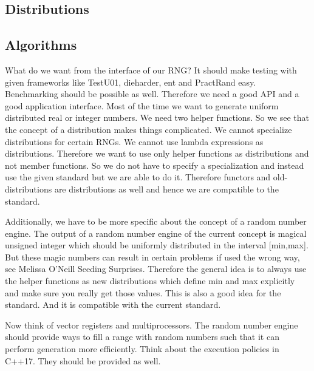 \documentclass{stdlocal}
\begin{document}
  \subsection{Distributions} %
  \label{sub:distributions}


  \subsection{Algorithms} %
  \label{sub:algorithms}


  What do we want from the interface of our RNG?
  It should make testing with given frameworks like TestU01, dieharder, ent and PractRand easy.
  Benchmarking should be possible as well.
  Therefore we need a good API and a good application interface.
  Most of the time we want to generate uniform distributed real or integer numbers.
  We need two helper functions.
  So we see that the concept of a distribution makes things complicated.
  We cannot specialize distributions for certain RNGs.
  We cannot use lambda expressions as distributions.
  Therefore we want to use only helper functions as distributions and not member functions.
  So we do not have to specify a specialization and instead use the given standard but we are able to do it.
  Therefore functors and old-distributions are distributions as well and hence we are compatible to the standard.

  Additionally, we have to be more specific about the concept of a random number engine.
  The output of a random number engine of the current concept is magical unsigned integer which should be uniformly distributed in the interval [min,max].
  But these magic numbers can result in certain problems if used the wrong way, see Melissa O'Neill Seeding Surprises.
  Therefore the general idea is to always use the helper functions as new distributions which define min and max explicitly and make sure you really get those values.
  This is also a good idea for the standard.
  And it is compatible with the current standard.

  Now think of vector registers and multiprocessors.
  The random number engine should provide ways to fill a range with random numbers such that it can perform generation more efficiently.
  Think about the execution policies in C++17.
  They should be provided as well.
\end{document}
